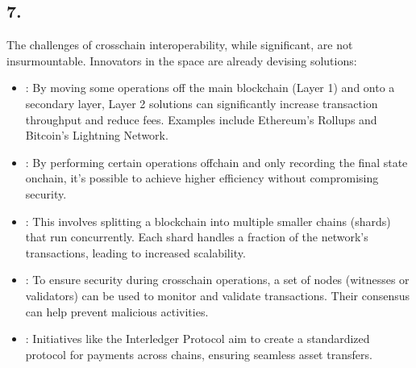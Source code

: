 \documentclass[letterpaper,10pt,english]{jupyterBook}
\begin{document}
\subsection{7. }
\label{\detokenize{Interoperability/Cross-Chain Interoperability:potential-solutions-to-challenges}}
\sphinxAtStartPar
The challenges of cross\sphinxhyphen{}chain interoperability, while significant, are not insurmountable. Innovators in the space are already devising solutions:
\begin{itemize}
\item {} 
\sphinxAtStartPar
{}: By moving some operations off the main blockchain (Layer 1) and onto a secondary layer, Layer 2 solutions can significantly increase transaction throughput and reduce fees. Examples include Ethereum’s Rollups and Bitcoin’s Lightning Network.

\item {} 
\sphinxAtStartPar
{}: By performing certain operations off\sphinxhyphen{}chain and only recording the final state on\sphinxhyphen{}chain, it’s possible to achieve higher efficiency without compromising security.

\item {} 
\sphinxAtStartPar
{}: This involves splitting a blockchain into multiple smaller chains (shards) that run concurrently. Each shard handles a fraction of the network’s transactions, leading to increased scalability.

\item {} 
\sphinxAtStartPar
{}: To ensure security during cross\sphinxhyphen{}chain operations, a set of nodes (witnesses or validators) can be used to monitor and validate transactions. Their consensus can help prevent malicious activities.

\item {} 
\sphinxAtStartPar
{}: Initiatives like the Interledger Protocol aim to create a standardized protocol for payments across chains, ensuring seamless asset transfers.

\end{itemize}
\end{document}
